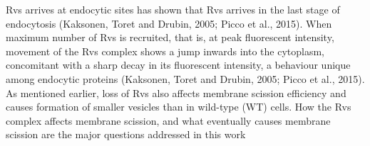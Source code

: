  	\vspace{2mm}
Rvs arrives at endocytic sites has shown that Rvs arrives in the last stage of endocytosis (Kaksonen, Toret and Drubin, 2005; Picco et al., 2015). When maximum number of Rvs is recruited, that is, at peak fluorescent intensity, movement of the Rvs complex shows a jump inwards into the cytoplasm, concomitant with a sharp decay in its fluorescent intensity, a behaviour unique among endocytic proteins (Kaksonen, Toret and Drubin, 2005; Picco et al., 2015). As mentioned earlier, loss of Rvs also affects membrane scission efficiency and causes formation of smaller vesicles than in wild-type (WT) cells. How the Rvs complex affects membrane scission, and what eventually causes membrane scission are the major questions addressed in this work




		

